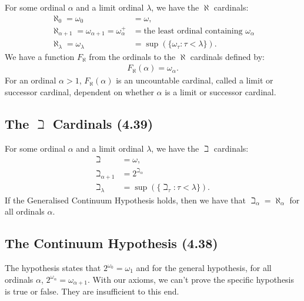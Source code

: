 For some ordinal $\alpha$ and a limit ordinal $\lambda$, we have the $\aleph$
cardinals: \begin{align*}
    \aleph_0 = \omega_0 
    &= \omega, \\
    \aleph_{\alpha + 1} = \omega_{\alpha + 1} = \omega_{\alpha}^+ 
    &= \text{the least ordinal containing } \omega_{\alpha} \\
    \aleph_{\lambda}  = \omega_{\lambda} 
    &= \sup(\{\omega_{\tau} : \tau < \lambda\}).
\end{align*} We have a function $F_\aleph$ from the ordinals to
the $\aleph$ cardinals defined by: \begin{align*}
    F_\aleph(\alpha) = \omega_\alpha.
\end{align*} For an ordinal $\alpha > 1$, $F_\aleph(\alpha)$ is an
uncountable cardinal, called a limit or successor cardinal, dependent
on whether $\alpha$ is a limit or successor cardinal.

\subsection{The $\beth$ Cardinals (4.39)} \label{4.39}

For some ordinal $\alpha$ and a limit ordinal $\lambda$, we have the $\beth$
cardinals: \begin{align*}
    \beth
    &= \omega, \\
    \beth_{\alpha + 1}
    &= 2^{\beth_\alpha} \\
    \beth_{\lambda}
    &= \sup(\{\beth_\tau : \tau < \lambda\}).
\end{align*} If the Generalised Continuum Hypothesis holds, then
we have that $\beth_\alpha = \aleph_\alpha$ for all ordinals $\alpha$.

\subsection{The Continuum Hypothesis (4.38)} \label{4.38}

The hypothesis states that $2^{\omega_0} = \omega_1$ and
for the general hypothesis, for all ordinals $\alpha$, 
$2^{\omega_\alpha} = \omega_{\alpha + 1}$.
With our axioms, we can't prove the specific hypothesis is true or false.
They are insufficient to this end.
